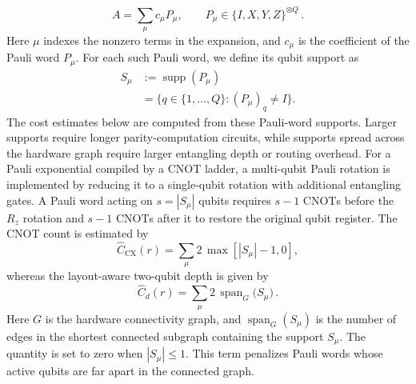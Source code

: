\documentclass[
  reprint,
  amsmath,
  amssymb,
  aps,
  pra,
  nofootinbib,
  superscriptaddress,
  floatfix
]{revtex4-2}
\begin{document}
\begin{equation}
A=\sum_{\mu}c_{\mu}P_{\mu}, \qquad P_{\mu}\in\{I,X,Y,Z\}^{\otimes Q}\,.
\label{eq:pauli_expansion}
\end{equation}
%
Here \(\mu\) indexes the nonzero terms in the expansion, and \(c_\mu\) is the
coefficient of the Pauli word \(P_\mu\).
For each such Pauli word, we define its qubit support as
%
\begin{equation}
\begin{aligned}
S_{\mu}
&:=\operatorname{supp}(P_{\mu}) \\
&=\{q\in\{1,\ldots,Q\}:(P_{\mu})_q\ne I\}.
\end{aligned}
\label{eq:pauli_word_support}
\end{equation}
%
The cost estimates below are computed from these Pauli-word supports. Larger supports require longer parity-computation circuits, while supports spread across the hardware graph require larger entangling depth or routing overhead. For a Pauli exponential compiled by a CNOT ladder, a multi-qubit Pauli rotation is implemented by reducing it to a single-qubit rotation with additional entangling gates. A Pauli word acting on \(s=|S_{\mu}|\) qubits requires \(s-1\) \textsc{CNOT}s before the \(R_z\) rotation and \(s-1\) \textsc{CNOT}s after it to restore the original qubit register. The CNOT count is estimated by
%
\begin{equation*}
\widehat C_{\mathrm{CX}}(r)=\sum_{\mu}2\,\max[|S_{\mu}|-1, 0],
\end{equation*}
whereas the layout-aware two-qubit depth is given by
\begin{equation*}
\widehat C_d(r)=\sum_{\mu}2\,\operatorname{span}_{G}
\bigl(S_{\mu}\bigr)\,.
\end{equation*}
Here \(G\) is the hardware connectivity graph, and $\operatorname{span}_{G}(S_{\mu})$ is the number of edges in the shortest connected subgraph containing the support \(S_{\mu}\). The quantity is set to zero when $|S_{\mu}|\le1$. This term penalizes Pauli words whose active qubits are far apart in the connected graph.
\end{document}
